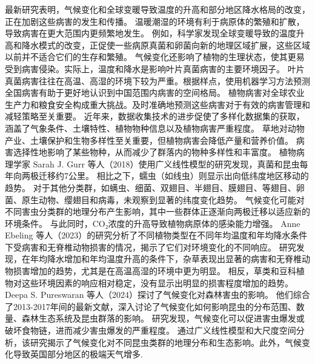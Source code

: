 \documentclass[AutoFakeBold]{LZUThesis-PgD&PhD}
\begin{document}
	最新研究表明，气候变化和全球变暖导致温度的升高和部分地区降水格局的改变，正在加剧这些病害的发生和传播。
	温暖潮湿的环境有利于病原体的繁殖和扩散，导致病害在更大范围内更频繁地发生。
	例如，科学家发现全球变暖导致的温度升高和降水模式的改变，正促使一些病原真菌和卵菌向新的地理区域扩展，这些区域以前并不适合它们的生存和繁殖。
	气候变化还影响了植物的生理状态，使其更易受到病害侵染。实际上，温度和降水是影响叶片真菌病害的主要环境因子。
	叶片真菌病害往往在高温、高湿的环境下较为严重。根据样点，使用机器学习方法预测全国病害有助于更好地认识到中国范围内病害的空间格局。
	植物病害对全球农业生产力和粮食安全构成重大挑战。及时准确地预测这些病害对于有效的病害管理和减轻策略至关重要。
	近年来，数据收集技术的进步促使了多样化数据集的获取，涵盖了气象条件、土壤特性、植物物种信息以及植物病害严重程度。
	草地对动物产业、土壤保护和生物多样性至关重要，但植物病害会降低产量和营养价值\cite{chakraborty2018climate}。
	病害选择性地影响了某些物种，从而减少了群落内的物种多样性和丰富度\cite{grunberg2023impact}。
	植物病理学家 Sarah J. Gurr 等人（2018）使用广义线性模型的研究发现，真菌和昆虫每年向两极迁移约7公里。
	相比之下，蠕虫（如线虫）则显示出向低纬度地区移动的趋势。
	对于其他分类群，如螨虫、细菌、双翅目、半翅目、膜翅目、等翅目、卵菌、原生动物、缨翅目和病毒，未观察到显著的纬度变化趋势。
	气候变化可能对不同害虫分类群的地理分布产生影响，其中一些群体正逐渐向两极迁移以适应新的环境条件。
	与此同时，CO₂浓度的升高导致植物病原体的感染能力增强\cite{sukumar2018co2}。
	Anne Ebeling 等人（2023）的研究分析了不同植物类型在不同年均温度和年均降水条件下受病害和无脊椎动物损害的情况，揭示了它们对环境变化的不同响应。
	研究发现，在年均降水增加和年均温度升高的条件下，杂草表现出显著的病害和无脊椎动物损害增加的趋势，尤其是在高温高湿的环境中更为明显。
	相反，草类和豆科植物对这些环境因素的响应相对稳定，没有显示出明显的损害程度增加的趋势\cite{ebeling2023response}。
	Deepa S. Pureswaran 等人（2024）探讨了气候变化对森林害虫的影响。
	他们综合了2013-2017年间的最新文献，深入讨论了气候变化如何影响昆虫的分布范围、数量、森林生态系统及昆虫群落的影响。
	研究发现，气候变化可以促进害虫爆发或破坏食物链，进而减少害虫爆发的严重程度。
	通过广义线性模型和大尺度空间分析，该研究揭示了气候变化对不同昆虫类群的地理分布和生态影响。此外，气候变化导致英国部分地区的极端天气增多\cite{angelotti2024forest}.
	
\end{document}
